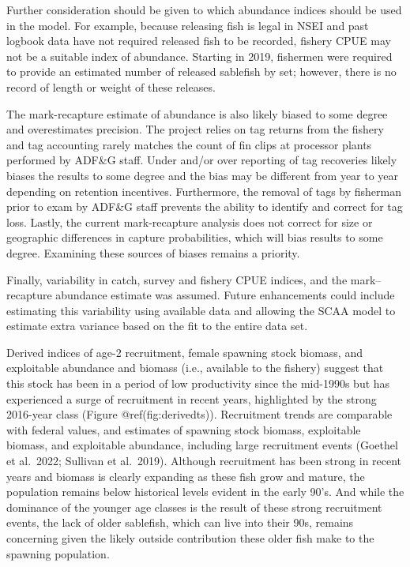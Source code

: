 \documentclass[
]{article}
\begin{document}
Further consideration should be given to which abundance indices should
be used in the model. For example, because releasing fish is legal in
NSEI and past logbook data have not required released fish to be
recorded, fishery CPUE may not be a suitable index of abundance.
Starting in 2019, fishermen were required to provide an estimated number
of released sablefish by set; however, there is no record of length or
weight of these releases.

The mark-recapture estimate of abundance is also likely biased to some
degree and overestimates precision. The project relies on tag returns
from the fishery and tag accounting rarely matches the count of fin
clips at processor plants performed by ADF\&G staff. Under and/or over
reporting of tag recoveries likely biases the results to some degree and
the bias may be different from year to year depending on retention
incentives. Furthermore, the removal of tags by fisherman prior to exam
by ADF\&G staff prevents the ability to identify and correct for tag
loss. Lastly, the current mark-recapture analysis does not correct for
size or geographic differences in capture probabilities, which will bias
results to some degree. Examining these sources of biases remains a
priority.

Finally, variability in catch, survey and fishery CPUE indices, and the
mark--recapture abundance estimate was assumed. Future enhancements
could include estimating this variability using available data and
allowing the SCAA model to estimate extra variance based on the fit to
the entire data set.

Derived indices of age-2 recruitment, female spawning stock biomass, and
exploitable abundance and biomass (i.e., available to the fishery)
suggest that this stock has been in a period of low productivity since
the mid-1990s but has experienced a surge of recruitment in recent
years, highlighted by the strong 2016-year class (Figure
@ref(fig:derivedts)). Recruitment trends are comparable with federal
values, and estimates of spawning stock biomass, exploitable biomass,
and exploitable abundance, including large recruitment events (Goethel
et al.~2022; Sullivan et al.~2019). Although recruitment has been strong
in recent years and biomass is clearly expanding as these fish grow and
mature, the population remains below historical levels evident in the
early 90's. And while the dominance of the younger age classes is the
result of these strong recruitment events, the lack of older sablefish,
which can live into their 90s, remains concerning given the likely
outside contribution these older fish make to the spawning population.
\end{document}
